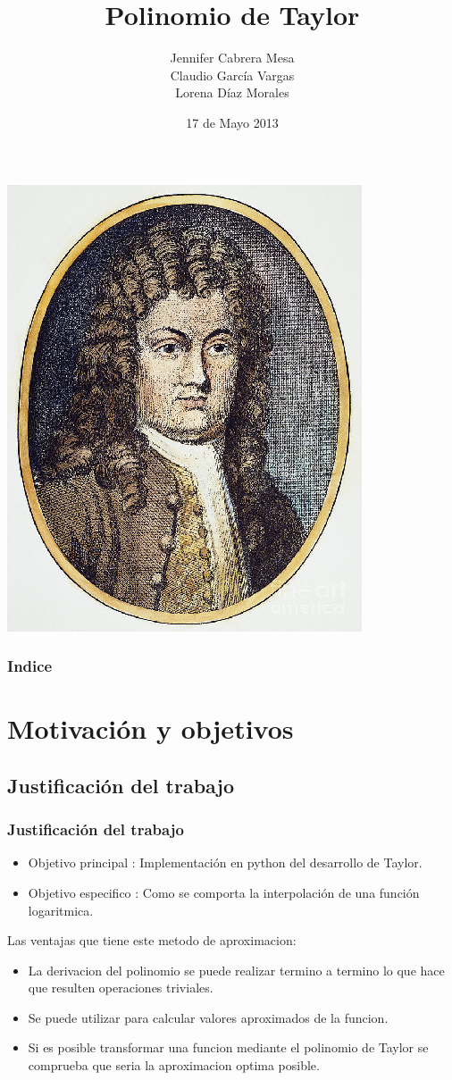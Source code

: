 \documentclass{beamer}
\title{Polinomio de Taylor}
\author{{Jennifer Cabrera Mesa} \\ {Claudio García Vargas} \\ {Lorena Díaz Morales} \\ \bigskip {Universidad de La Laguna}}
\date{17 de Mayo 2013}
\begin{document}
\begin{frame}[plain]
\begin{center}
 \includegraphics[width=0.2 \textwidth]{brook-taylor.eps}
\end{center}

\titlepage
\end{frame}

\begin{frame}
\frametitle{Indice}
\small
\tableofcontents[pausesections]
\end{frame}


\section{Motivación y objetivos}
\subsection{Justificación del trabajo}
\begin{frame}
\frametitle{Justificación del trabajo}
\begin{itemize}
 \item
    Objetivo principal : Implementación en python del desarrollo de Taylor.
 \item
    Objetivo especifico : Como se comporta la interpolación de una función logaritmica.
\end{itemize}
Las ventajas que tiene este metodo de aproximacion:
\begin{itemize}
 \item 
    La derivacion del polinomio se puede realizar termino a termino lo que hace que resulten operaciones triviales. 
 \item
    Se puede utilizar para calcular valores aproximados de la funcion.
 \item
    Si es posible transformar una funcion mediante el polinomio de Taylor se comprueba que seria la aproximacion optima posible. 
\end{itemize}
\end{frame}
\end{document}
